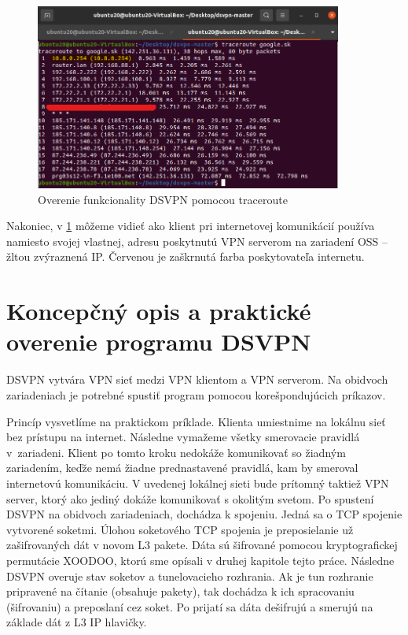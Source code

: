 \begin{figure}[!h]
	\centering
	\includegraphics[width=0.9\textwidth]{figures/vpntru20}
	\caption{Overenie funkcionality DSVPN pomocou traceroute}
	\label{vpntru20}
\end{figure}
Nakoniec, v \ref{vpntru20} môžeme vidieť ako klient pri internetovej komunikácií používa namiesto svojej vlastnej, adresu poskytnutú VPN serverom na zariadení OSS -- žltou zvýraznená IP. Červenou je zaškrnutá farba poskytovateľa internetu. 

\section{Koncepčný opis a praktické overenie programu DSVPN}
DSVPN vytvára VPN sieť medzi VPN klientom a VPN serverom. Na obidvoch zariadeniach je potrebné spustiť program pomocou korešpondujúcich príkazov. 

Princíp vysvetlíme na praktickom príklade. Klienta umiestnime na lokálnu sieť bez prístupu na internet. Následne vymažeme všetky smerovacie pravidlá v~zariadeni. Klient po tomto kroku nedokáže komunikovať so žiadným zariadením, keďže nemá žiadne prednastavené pravidlá, kam by smeroval internetovú komunikáciu. V uvedenej lokálnej sieti bude prítomný taktiež VPN server, ktorý ako jediný dokáže komunikovať s okolitým svetom. Po spustení DSVPN na obidvoch zariadeniach, dochádza k spojeniu. Jedná sa o TCP spojenie vytvorené soketmi. Úlohou soketového TCP spojenia je preposielanie už zašifrovaných dát v novom L3 pakete. Dáta sú šifrované pomocou kryptografickej permutácie XOODOO, ktorú sme opísali v druhej kapitole tejto práce. Následne DSVPN overuje stav soketov a tunelovacieho rozhrania. Ak je tun rozhranie pripravené na čítanie (obsahuje pakety), tak dochádza k ich spracovaniu (šifrovaniu) a preposlaní cez soket. Po prijatí sa dáta dešifrujú a smerujú na základe dát z L3 IP hlavičky. 

